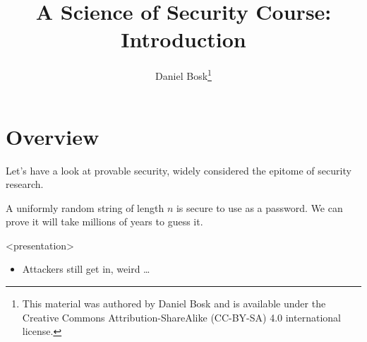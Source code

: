 \title{%
  A Science of Security Course: Introduction
}
\author{Daniel Bosk\thanks{%
    This material was authored by Daniel Bosk and is available under the 
    Creative Commons Attribution-ShareAlike (CC-BY-SA) 4.0 international 
    license.
}}


\mode*

\begin{abstract}
  
\end{abstract}

\clearpage
\tableofcontents
\clearpage

\section{Overview}

Let's have a look at provable security, widely considered the epitome of 
security research.

\begin{frame}
  \begin{example}\label{SecurePassword}
    A uniformly random string of length \(n\) is secure to use as a password.
    We can prove it will take millions of years to guess it.
  \end{example}

  \pause

  \begin{onlyenv}<presentation>
    \begin{remark}
      \begin{itemize}
        \item Attackers still get in, weird \dots
      \end{itemize}
    \end{remark}
  \end{onlyenv}
\end{frame}

